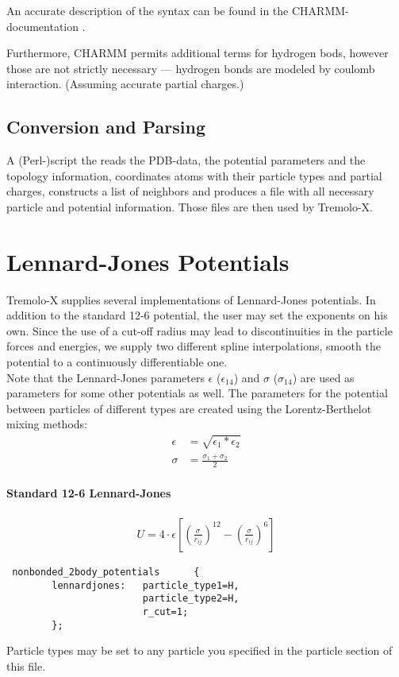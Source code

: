 An accurate description of the syntax can be found in the
CHARMM-documentation \cite{charmm27b-online}.

Furthermore, CHARMM permits additional terms for hydrogen bods, however those
are not strictly necessary --- hydrogen bonds are modeled by coulomb interaction.
(Assuming accurate partial charges.)

\subsection{Conversion and Parsing}
A (Perl-)script the reads the PDB-data, the potential parameters and the topology
information, coordinates atoms with their particle types and partial charges,
constructs a list of neighbors and produces a file with all necessary particle and
potential information.
Those files are then used by Tremolo-X.

\section{Lennard-Jones Potentials}

Tremolo-X supplies several implementations of Lennard-Jones potentials. In addition to the standard 12-6 potential, the user may set the exponents on his own.
Since the use of a cut-off radius may lead to discontinuities in the particle forces and energies, we supply two different spline interpolations, smooth the
potential to a continuously differentiable one.\\
Note that the Lennard-Jones parameters $\epsilon$ ($\epsilon_{14}$) and $\sigma$ ($\sigma_{14}$) are used as parameters for some other potentials as well.
The parameters for the potential between particles of different types are created using the Lorentz-Berthelot mixing methods:
\begin{align*}
\epsilon &= \sqrt{\epsilon_1*\epsilon_2}\\
  \sigma &= \frac{\sigma_1+\sigma_2}{2}
\end{align*}

\paragraph{Standard 12-6 Lennard-Jones}
\begin{align*}
U = 4 \cdot \epsilon \left[ \left( \frac{\sigma}{r_{ij}}\right)^{12}-\left(\frac{\sigma}{r_{ij}} \right)^6 \right]
\end{align*}
\begin{lstlisting}
 nonbonded_2body_potentials      {
        lennardjones:   particle_type1=H,
                        particle_type2=H,
                        r_cut=1;
        };
\end{lstlisting}
Particle types may be set to any particle you specified in the particle section of this file.

